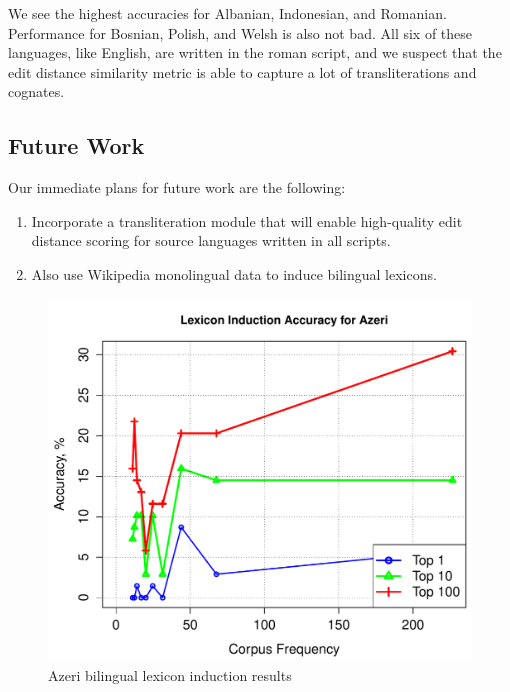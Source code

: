 \documentclass[11pt]{article}
\begin{document}
We see the highest accuracies for Albanian, Indonesian, and Romanian. Performance for Bosnian, Polish, and Welsh is also not bad. All six of these languages, like English, are written in the roman script, and we suspect that the edit distance similarity metric is able to capture a lot of transliterations and cognates. 

\subsection{Future Work}
Our immediate plans for future work are the following:
\begin{enumerate}
\item{Incorporate a transliteration module that will enable high-quality edit distance scoring for source languages written in all scripts.}
\item{Also use Wikipedia monolingual data to induce bilingual lexicons.}
\end{enumerate}



\begin{figure}[h]
\begin{center}
\includegraphics[width=0.9 \linewidth]{../byFreqGraphs/az/lexinductnew.pdf}
\vskip -0.15in
\caption{Azeri bilingual lexicon induction results}
\label{fig:bli.az} 
\end{center}
\end{figure}
\end{document}
